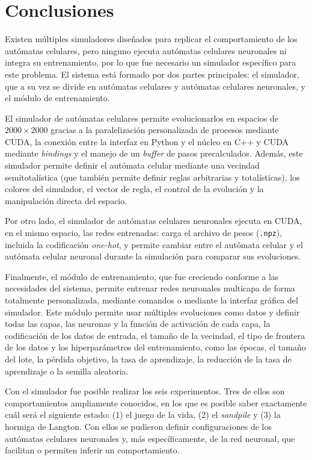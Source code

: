 \chapter{Conclusiones}

Existen múltiples simuladores diseñados para replicar el comportamiento de los autómatas celulares, pero ninguno ejecuta autómatas celulares neuronales ni integra su entrenamiento, por lo que fue necesario un simulador específico para este problema. El sistema está formado por dos partes principales: el simulador, que a su vez se divide en autómatas celulares y autómatas celulares neuronales, y el módulo de entrenamiento.

El simulador de autómatas celulares permite evolucionarlos en espacios de $2000 \times 2000$ gracias a la paralelización personalizada de procesos mediante CUDA, la conexión entre la interfaz en Python y el núcleo en C++ y CUDA mediante \textit{bindings} y el manejo de un \textit{buffer} de pasos precalculados. Además, este simulador permite definir el autómata celular mediante una vecindad semitotalística (que también permite definir reglas arbitrarias y totalísticas), los colores del simulador, el vector de regla, el control de la evolución y la manipulación directa del espacio.

Por otro lado, el simulador de autómatas celulares neuronales ejecuta en CUDA, en el mismo espacio, las redes entrenadas: carga el archivo de pesos (\texttt{.npz}), incluida la codificación \textit{one-hot}, y permite cambiar entre el autómata celular y el autómata celular neuronal durante la simulación para comparar sus evoluciones.

Finalmente, el módulo de entrenamiento, que fue creciendo conforme a las necesidades del sistema, permite entrenar redes neuronales multicapa de forma totalmente personalizada, mediante comandos o mediante la interfaz gráfica del simulador. Este módulo permite usar múltiples evoluciones como datos y definir todas las capas, las neuronas y la función de activación de cada capa, la codificación de los datos de entrada, el tamaño de la vecindad, el tipo de frontera de los datos y los hiperparámetros del entrenamiento, como las épocas, el tamaño del lote, la pérdida objetivo, la tasa de aprendizaje, la reducción de la tasa de aprendizaje o la semilla aleatoria.

Con el simulador fue posible realizar los seis experimentos. Tres de ellos son comportamientos ampliamente conocidos, en los que es posible saber exactamente cuál será el siguiente estado: (1) el juego de la vida, (2) el \textit{sandpile} y (3) la hormiga de Langton. Con ellos se pudieron definir configuraciones de los autómatas celulares neuronales y, más específicamente, de la red neuronal, que facilitan o permiten inferir un comportamiento.

